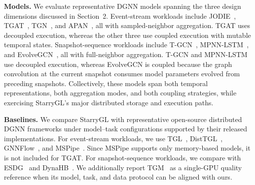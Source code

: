 \noindent\textbf{Models.}
We evaluate representative DGNN models spanning the three design
dimensions discussed in Section~2. Event-stream workloads include
JODIE~\cite{jodie}, TGAT~\cite{tgat}, TGN~\cite{tgn}, and
APAN~\cite{apan}, all with sampled-neighbor aggregation. TGAT uses
decoupled execution, whereas the other three use coupled execution
with mutable temporal states. Snapshot-sequence workloads include
T-GCN~\cite{tgcn}, MPNN-LSTM~\cite{mpnnlstm}, and
EvolveGCN~\cite{evolvegcn}, all with full-neighbor aggregation. T-GCN and MPNN-LSTM use decoupled
execution, whereas EvolveGCN is coupled because the graph convolution at the current snapshot consumes model parameters
evolved from preceding snapshots.
Collectively, these models span both temporal representations, both
aggregation modes, and both coupling strategies, while exercising
StarryGL's major distributed storage and execution paths.

\noindent\textbf{Baselines.}
We compare StarryGL with representative open-source distributed
DGNN frameworks under model--task configurations supported by their
released implementations. For event-stream workloads, we use
TGL~\cite{zhou2022tgl}, DistTGL~\cite{zhou2023disttgl},
GNNFlow~\cite{zhong2023gnnflow}, and
MSPipe~\cite{sheng2024mspipe}. Since MSPipe supports only
memory-based models, it is not included for TGAT. For
snapshot-sequence workloads, we compare with ESDG~\cite{ESDG} and
DynaHB~\cite{dynahb}. We additionally report TGM~\cite{tgm} as a
single-GPU quality reference when its model, task, and data protocol
can be aligned with ours.


